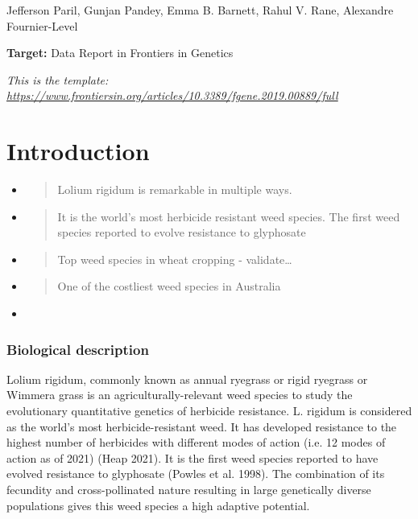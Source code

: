 Jefferson Paril, Gunjan Pandey, Emma B. Barnett, Rahul V. Rane,
Alexandre Fournier-Level

\textbf{Target:} Data Report in Frontiers in Genetics

\emph{This is the template:
\href{https://www.frontiersin.org/articles/10.3389/fgene.2019.00889/full}{\uline{https://www.frontiersin.org/articles/10.3389/fgene.2019.00889/full}}}

\hypertarget{introduction}{%
\section{Introduction}\label{introduction}}

\begin{itemize}
\item
  \begin{quote}
  Lolium rigidum is remarkable in multiple ways.
  \end{quote}
\item
  \begin{quote}
  It is the world's most herbicide resistant weed species. The first
  weed species reported to evolve resistance to glyphosate
  \end{quote}
\item
  \begin{quote}
  Top weed species in wheat cropping - validate\ldots{}
  \end{quote}
\item
  \begin{quote}
  One of the costliest weed species in Australia
  \end{quote}
\item
\end{itemize}

\hypertarget{biological-description}{%
\subsubsection{Biological description}\label{biological-description}}

Lolium rigidum, commonly known as annual ryegrass or rigid ryegrass or
Wimmera grass is an agriculturally-relevant weed species to study the
evolutionary quantitative genetics of herbicide resistance. L. rigidum
is considered as the world's most herbicide-resistant weed. It has
developed resistance to the highest number of herbicides with different
modes of action (i.e. 12 modes of action as of 2021) (Heap 2021). It is
the first weed species reported to have evolved resistance to glyphosate
(Powles et al. 1998). The combination of its fecundity and
cross-pollinated nature resulting in large genetically diverse
populations gives this weed species a high adaptive potential.

